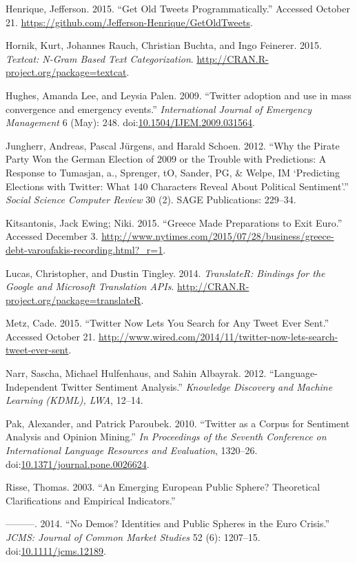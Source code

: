 \documentclass[]{article}
\begin{document}
Henrique, Jefferson. 2015. ``Get Old Tweets Programmatically.'' Accessed
October 21. \url{https://github.com/Jefferson-Henrique/GetOldTweets}.

Hornik, Kurt, Johannes Rauch, Christian Buchta, and Ingo Feinerer. 2015.
\emph{Textcat: N-Gram Based Text Categorization}.
\url{http://CRAN.R-project.org/package=textcat}.

Hughes, Amanda Lee, and Leysia Palen. 2009. ``Twitter adoption and use
in mass convergence and emergency events.'' \emph{International Journal
of Emergency Management} 6 (May): 248.
doi:\href{http://dx.doi.org/10.1504/IJEM.2009.031564}{10.1504/IJEM.2009.031564}.

Jungherr, Andreas, Pascal J{ü}rgens, and Harald Schoen. 2012. ``Why the
Pirate Party Won the German Election of 2009 or the Trouble with
Predictions: A Response to Tumasjan, a., Sprenger, tO, Sander, PG, \&
Welpe, IM `Predicting Elections with Twitter: What 140 Characters Reveal
About Political Sentiment'.'' \emph{Social Science Computer Review} 30
(2). SAGE Publications: 229--34.

Kitsantonis, Jack Ewing; Niki. 2015. ``Greece Made Preparations to Exit
Euro.'' Accessed December 3.
\url{http://www.nytimes.com/2015/07/28/business/greece-debt-varoufakis-recording.html?_r=1}.

Lucas, Christopher, and Dustin Tingley. 2014. \emph{TranslateR: Bindings
for the Google and Microsoft Translation APIs}.
\url{http://CRAN.R-project.org/package=translateR}.

Metz, Cade. 2015. ``Twitter Now Lets You Search for Any Tweet Ever
Sent.'' Accessed October 21.
\url{http://www.wired.com/2014/11/twitter-now-lets-search-tweet-ever-sent}.

Narr, Sascha, Michael Hulfenhaus, and Sahin Albayrak. 2012.
``Language-Independent Twitter Sentiment Analysis.'' \emph{Knowledge
Discovery and Machine Learning (KDML), LWA}, 12--14.

Pak, Alexander, and Patrick Paroubek. 2010. ``Twitter as a Corpus for
Sentiment Analysis and Opinion Mining.'' \emph{In Proceedings of the
Seventh Conference on International Language Resources and Evaluation},
1320--26.
doi:\href{http://dx.doi.org/10.1371/journal.pone.0026624}{10.1371/journal.pone.0026624}.

Risse, Thomas. 2003. ``An Emerging European Public Sphere? Theoretical
Clarifications and Empirical Indicators.''

---------. 2014. ``No Demos? Identities and Public Spheres in the Euro
Crisis.'' \emph{JCMS: Journal of Common Market Studies} 52 (6):
1207--15.
doi:\href{http://dx.doi.org/10.1111/jcms.12189}{10.1111/jcms.12189}.
\end{document}
